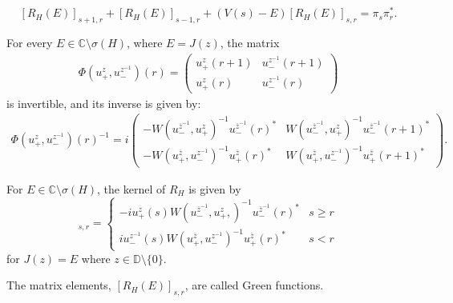\documentclass[10pt,a4paper]{amsart}
\begin{document}
\begin{equation}
\label{eq:kernel}
[R_{H}(E)]_{s+1,r} + [R_{H}(E)]_{s-1,r} + (V(s) - E) [R_{H}(E)]_{s,r} = \pi_s \pi_r^{*}.
\end{equation}

\begin{lema}\label{aaaa}
    For every $E \in \mathbb{C}\setminus \sigma(H)$, where $E = J(z)$, the matrix
    \begin{align}\label{aaa}
        \Phi(u_+^z, u_-^{z^{-1}})(r) = 
        \begin{pmatrix}
            u_+^z(r+1) & u_-^{z^{-1}}(r+1) \\
            u_+^z(r) & u_-^{z^{-1}}(r)
        \end{pmatrix}
    \end{align}
    is invertible, and its inverse is given by:
    \begin{align}
        \Phi(u_+^z, u_-^{z^{-1}})(r)^{-1} = 
       i \begin{pmatrix}
            -W(u_-^{\overline{z}^{-1}}, u_+^z)^{-1} u_-^{\overline{z}^{-1}}(r)^* 
            & W(u_-^{\overline{z}^{-1}}, u_+^z)^{-1} u_-^{\overline{z}^{-1}}(r+1)^* \\
            -W(u_+^{\overline{z}}, u_-^{z^{-1}})^{-1} u_+^{\overline{z}}(r)^* 
            & W(u_+^{\overline{z}}, u_-^{z^{-1}})^{-1} u_+^{\overline{z}}(r+1)^*
        \end{pmatrix}.
    \end{align}
\end{lema}

\begin{teo}\label{formulaGreenmatrixelements}
    For  $E\in \mathbb{C}\setminus \sigma (H)$, the kernel of $R_{H}$ is given by
    \begin{equation}
    [R_{H}(E)]_{s,r}=
    \label{eq:Green}
 \left\{ \begin{array}{lcc}
               -iu_{+}^{z}(s) W(u_{-}^{\overline{z}^{-1}},u_{+}^{z},)^{-1} u_{-}^{\overline{z}^{-1}}(r)^{*} &   s\geq r \\
            iu_{-}^{z^{-1}}(s) W(u_{+}^{\overline{z}}, u_{-}^{z^{-1}})^{-1} u_{+}^{\overline{z}}(r)^{*} &  s< r
             \end{array}
   \right.
   \end{equation}
   for $J(z)=E$ where $z\in \mathbb{D}\setminus \{0\}$. 
   
   The matrix elements, $[R_{H}(E)]_{s,r}$, are called Green functions.
\end{teo}
\end{document}
